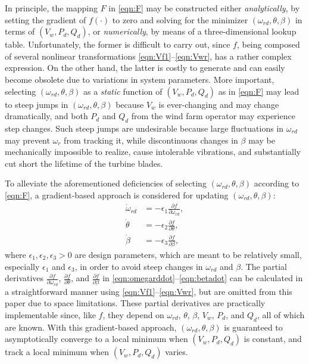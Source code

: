 \documentclass[journal]{IEEEtran}
\begin{document}
In principle, the mapping $F$ in \eqref{eqn:F} may be constructed either {\em analytically}, by setting the gradient of $f(\cdot)$ to zero and solving for the minimizer $(\omega_{rd}, \theta, \beta)$ in terms of $(V_w, P_d, Q_d)$, or {\em numerically}, by means of a three-dimensional lookup table. Unfortunately, the former is difficult to carry out, since $f$, being composed of several nonlinear transformations \eqref{eqn:Vf1}--\eqref{eqn:Vwr}, has a rather complex expression. On the other hand, the latter is costly to generate and can easily become obsolete due to variations in system parameters. More important, selecting $(\omega_{rd}, \theta, \beta)$ as a {\em static} function of $(V_w, P_d, Q_d)$ as in \eqref{eqn:F} may lead to steep jumps in $(\omega_{rd}, \theta, \beta)$ because $V_w$ is ever-changing and may change dramatically, and both $P_d$ and $Q_d$ from the wind farm operator may experience step changes. Such steep jumps are undesirable because large fluctuations in $\omega_{rd}$ may prevent $\omega_r$ from tracking it, while discontinuous changes in $\beta$ may be mechanically impossible to realize, cause intolerable vibrations, and substantially cut short the lifetime of the turbine blades.

To alleviate the aforementioned deficiencies of selecting $(\omega_{rd}, \theta, \beta)$ according to \eqref{eqn:F}, a gradient-based approach is considered for updating $(\omega_{rd}, \theta, \beta)$:
\begin{align}
\dot{\omega}_{rd}&=-\epsilon_1\frac{\partial f}{\partial \omega_{rd}},\label{eqn:omegarddot}\\
\dot{\theta}&=-\epsilon_2\frac{\partial f}{\partial \theta},\label{eqn:thetadot}\\
\dot{\beta}&=-\epsilon_3\frac{\partial f}{\partial \beta},\label{eqn:betadot}
\end{align}
where $\epsilon_1, \epsilon_2, \epsilon_3>0$ are design parameters, which are meant to be relatively small, especially $\epsilon_1$ and $\epsilon_3$, in order to avoid steep changes in $\omega_{rd}$ and $\beta$. The partial derivatives $\frac{\partial f}{\partial \omega_{rd}}$, $\frac{\partial f}{\partial \theta}$, and $\frac{\partial f}{\partial \beta}$ in \eqref{eqn:omegarddot}--\eqref{eqn:betadot} can be calculated in a straightforward manner using \eqref{eqn:Vf1}--\eqref{eqn:Vwr}, but are omitted from this paper due to space limitations. These partial derivatives are practically implementable since, like $f$, they depend on $\omega_{rd}$, $\theta$, $\beta$, $V_w$, $P_d$, and $Q_d$, all of which are known. With this gradient-based approach, $(\omega_{rd}, \theta, \beta)$ is guaranteed to asymptotically converge to a local minimum when $(V_w, P_d, Q_d)$ is constant, and track a local minimum when $(V_w, P_d, Q_d)$ varies.
\end{document}

